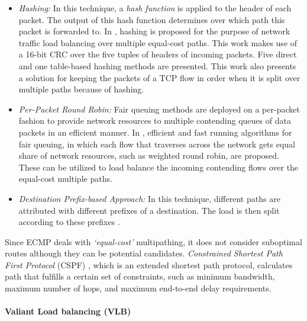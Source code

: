 \documentclass[10pt]{IEEEtran}
\begin{document}
\begin{itemize}

\vspace{1mm}
\item{\textit{Hashing:}} In this technique, a \textit{hash function} is applied to the header of each packet. The output of this hash function determines over which path this packet is forwarded to. In \cite{cao2000performance}, hashing is proposed for the purpose of network traffic load balancing over multiple equal-cost paths. This work makes use of a 16-bit CRC over the five tuples of headers of incoming packets. Five direct and one table-based hashing methods are presented. This work also presents a solution for keeping the packets of a TCP flow in order when it is split over multiple paths because of hashing.

\vspace{1mm}
\item{\textit{Per-Packet Round Robin:}} Fair queuing methods are deployed on a per-packet fashion to provide network resources to multiple contending queues of data packets in an efficient manner. In \cite{shreedhar1995efficient}, efficient and fast running algorithms for fair queuing, in which each flow that traverses across the network gets equal share of network resources, such as weighted round robin, are proposed. These can be utilized to load balance the incoming contending flows over the equal-cost multiple paths.

\vspace{1mm}
\item{\textit{Destination Prefix-based Approach:}} In this technique, different paths are attributed with different prefixes of a destination. The load is then split according to these prefixes \cite{villamizar1999ospf}.

\end{itemize}

Since ECMP deals with \textit{`equal-cost'} multipathing, it does not consider suboptimal routes although they can be potential candidates. \textit{Constrained Shortest Path First Protocol} (CSPF) \cite{manayya2010constrained}, which is an extended shortest path protocol, calculates path that fulfills a certain set of constraints, such as minimum bandwidth, maximum number of hops, and maximum end-to-end delay requirements.

\vspace{2mm}
\paragraph{Valiant Load balancing (VLB)}
\label{subsubsec:vlb}
\end{document}
